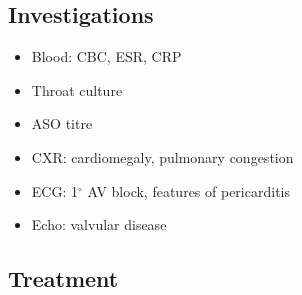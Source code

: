 \documentclass[
  12pt,
]{memoir}
\providecommand{\tightlist}{%
  \setlength{\itemsep}{0pt}\setlength{\parskip}{0pt}}
\begin{document}
\hypertarget{investigations-8}{%
\subsection{Investigations}\label{investigations-8}}

\begin{itemize}
\tightlist
\item
  Blood: CBC, ESR, CRP
\item
  Throat culture
\item
  ASO titre
\item
  CXR: cardiomegaly, pulmonary congestion
\item
  ECG: 1\(^\circ\) AV block, features of pericarditis
\item
  Echo: valvular disease
\end{itemize}

\hypertarget{treatment}{%
\subsection{Treatment}\label{treatment}}
\end{document}
